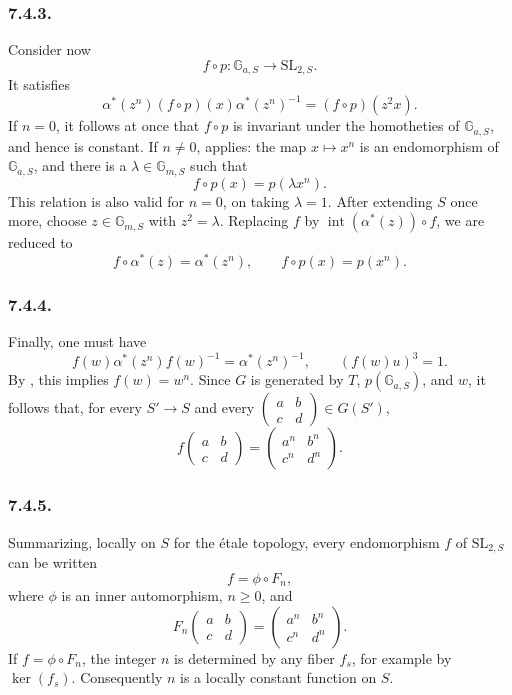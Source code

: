 \subsubsection*{7.4.3.}

Consider now
\[
  f\circ p:\mathbb G_{a,S}\longrightarrow\mathrm{SL}_{2,S}.
\]
It satisfies
\[
  \alpha^*(z^n)(f\circ p)(x)\alpha^*(z^n)^{-1}
  =
  (f\circ p)(z^2x).
\]
If \(n=0\), it follows at once that \(f\circ p\) is invariant under
the homotheties of \(\mathbb G_{a,S}\), and hence is constant. If
\(n\neq0\),  applies: the map
\(x\mapsto x^n\) is an endomorphism of \(\mathbb G_{a,S}\), and there
is a \(\lambda\in\mathbb G_{m,S}\) such that
\[
  f\circ p(x)=p(\lambda x^n).
\]
This relation is also valid for \(n=0\), on taking \(\lambda=1\).
After extending \(S\) once more, choose
\(z\in\mathbb G_{m,S}\) with \(z^2=\lambda\). Replacing \(f\) by
\(\operatorname{int}(\alpha^*(z))\circ f\), we are reduced to
\[
  f\circ\alpha^*(z)=\alpha^*(z^n),
  \qquad
  f\circ p(x)=p(x^n).
\]

\subsubsection*{7.4.4.}

Finally, one must have
\[
  f(w)\alpha^*(z^n)f(w)^{-1}=\alpha^*(z^n)^{-1},
  \qquad
  (f(w)u)^3=1.
\]
By , this implies \(f(w)=w^n\). Since \(G\) is generated
by \(T\), \(p(\mathbb G_{a,S})\), and \(w\), it follows that, for every
\(S'\to S\) and every
\(\begin{pmatrix}a&b\\c&d\end{pmatrix}\in G(S')\),
\[
  f\!\begin{pmatrix}a&b\\c&d\end{pmatrix}
  =
  \begin{pmatrix}a^n&b^n\\c^n&d^n\end{pmatrix}.
\]

\subsubsection*{7.4.5.}

Summarizing, locally on \(S\) for the étale topology, every
endomorphism \(f\) of \(\mathrm{SL}_{2,S}\) can be written
\[
  f=\phi\circ F_n,
\]
where \(\phi\) is an inner automorphism, \(n\geq0\), and
\[
  F_n\!\begin{pmatrix}a&b\\c&d\end{pmatrix}
  =
  \begin{pmatrix}a^n&b^n\\c^n&d^n\end{pmatrix}.
\]
If \(f=\phi\circ F_n\), the integer \(n\) is determined by any fiber
\(f_s\), for example by \(\ker(f_s)\). Consequently \(n\) is a
locally constant function on \(S\).

